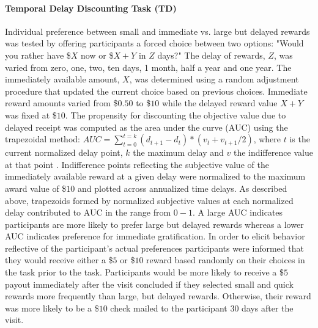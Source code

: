 \documentclass[utf8]{stylesheet}
\begin{document}
\paragraph{Temporal Delay Discounting Task (TD)} Individual preference between small and immediate vs. large but delayed rewards was tested by offering participants a forced choice between two options: "Would you rather have \$$X$ now or \$$X+Y$ in $Z$ days?" The delay of rewards, $Z$, was varied from zero, one, two, ten days, 1 month, half a year and one year. The immediately available amount, $X$, was determined using a random adjustment procedure that updated the current choice based on previous choices. Immediate reward amounts varied from \$$0.50$ to \$$10$ while the delayed reward value $X+Y$ was fixed at \$$10$. The propensity for discounting the objective value due to delayed receipt was computed as the area under the curve (AUC) using the trapezoidal method: $AUC = \sum_{t=0}^{t=k} (d_{t+1}-d_t)*(v_t+v_{t+1} /2)$, where $t$ is the current normalized delay point, $k$ the maximum delay and $v$ the indifference value at that point \citep{Borges2016,olson2007adolescents, myerson2001area}. Indifference points reflecting the subjective value of the immediately available reward at a given delay were normalized to the maximum award value of \$$10$ and plotted across annualized time delays. As described above, trapezoids formed by normalized subjective values at each normalized delay contributed to AUC in the range from $0-1$.  A large AUC indicates participants are more likely to prefer large but delayed rewards whereas a lower AUC indicates preference for immediate gratification. In order to elicit behavior reflective of the participant's actual preferences participants were informed that they would receive either a \$$5$ or \$$10$ reward based randomly on their choices in the task prior to the task. Participants would be more likely to receive a \$$5$ payout immediately after the visit concluded if they selected small and quick rewards more frequently than large, but delayed rewards. Otherwise, their reward was more likely to be a \$$10$ check mailed to the participant 30 days after the visit. 
\vspace{2pt}
\end{document}
